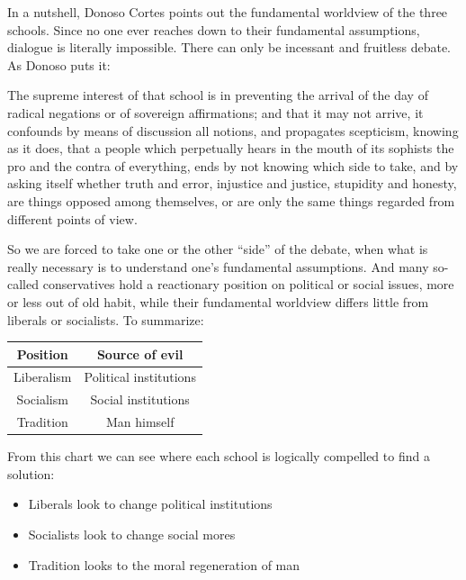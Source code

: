 In a nutshell, Donoso Cortes points out the fundamental worldview of the three schools. Since no one ever reaches down to their fundamental assumptions, dialogue is literally impossible. There can only be incessant and fruitless debate. As Donoso puts it:

\begin{quotex}
The supreme interest of that school is in preventing the arrival of the day of radical negations or of sovereign affirmations; and that it may not arrive, it confounds by means of discussion all notions, and propagates scepticism, knowing as it does, that a people which perpetually hears in the mouth of its sophists the pro and the contra of everything, ends by not knowing which side to take, and by asking itself whether truth and error, injustice and justice, stupidity and honesty, are things opposed among themselves, or are only the same things regarded from different points of view.
\end{quotex}


So we are forced to take one or the other ``side'' of the debate, when what is really necessary is to understand one's fundamental assumptions. And many so-called conservatives hold a reactionary position on political or social issues, more or less out of old habit, while their fundamental worldview differs little from liberals or socialists. To summarize:

\begin{table}[h]\centering\small
\begin{tabular}{cc}\toprule
\textbf{Position} & \textbf{Source of evil} \\\midrule
Liberalism & Political institutions \\ Socialism & Social institutions \\ Tradition & Man himself \\\bottomrule
\end{tabular}
\end{table}

From this chart we can see where each school is logically compelled to find a solution:

\begin{itemize}


\item Liberals look to change political institutions

\item Socialists look to change social mores

\item Tradition looks to the moral regeneration of man
\end{itemize}



